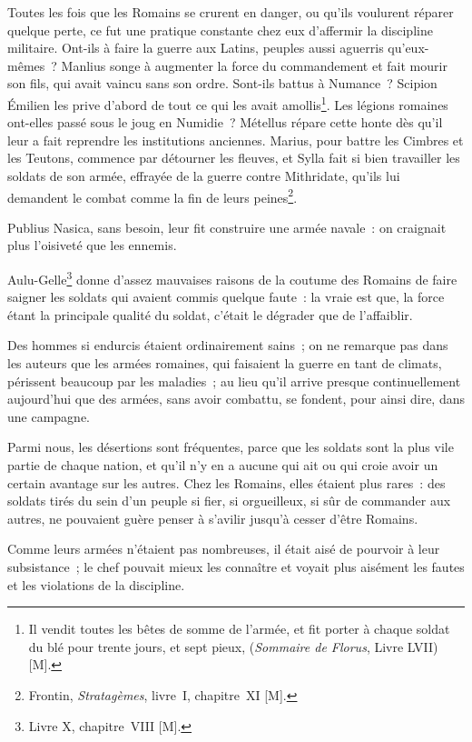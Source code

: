 \documentclass[french,twoside]{book} %
\begin{document}
Toutes les fois que les Romains se crurent en danger, ou qu’ils voulurent réparer quelque perte, ce fut une pratique constante chez eux d’affermir la discipline militaire. Ont-ils à faire la guerre aux Latins, peuples aussi aguerris qu’eux-mêmes ? Manlius songe à augmenter la force du commandement et fait mourir son fils, qui avait vaincu sans son ordre. Sont-ils battus à Numance ? Scipion Émilien les prive d’abord de tout ce qui les avait amollis\footnote{Il vendit toutes les bêtes de somme de l’armée, et fit porter à chaque soldat du blé pour trente jours, et sept pieux, ({\itshape Sommaire de Florus}, Livre LVII) [M].}. Les légions romaines ont-elles passé sous le joug en Numidie ? Métellus répare cette honte dès qu’il leur a fait reprendre les institutions anciennes. Marius, pour battre les Cimbres et les Teutons, commence par détourner les fleuves, et Sylla fait si bien travailler les soldats de son armée, effrayée de la guerre contre Mithridate, qu’ils lui demandent le combat comme la fin de leurs peines\footnote{Frontin, {\itshape Stratagèmes}, livre I, chapitre XI [M].}.\par
Publius Nasica, sans besoin, leur fit construire une armée navale : on craignait plus l’oisiveté que les ennemis.\par
Aulu-Gelle\footnote{Livre X, chapitre VIII [M].} donne d’assez mauvaises raisons de la coutume des Romains de faire saigner les soldats qui avaient commis quelque faute : la vraie est que, la force étant la principale qualité du soldat, c’était le dégrader que de l’affaiblir.\par
Des hommes si endurcis étaient ordinairement sains ; on ne remarque pas dans les auteurs que les armées romaines, qui faisaient la guerre en tant de climats, périssent beaucoup par les maladies ; au lieu qu’il arrive presque continuellement aujourd’hui que des armées, sans avoir combattu, se fondent, pour ainsi dire, dans une campagne.\par
Parmi nous, les désertions sont fréquentes, parce que les soldats sont la plus vile partie de chaque nation, et qu’il n’y en a aucune qui ait ou qui croie avoir un certain avantage sur les autres. Chez les Romains, elles étaient plus rares : des soldats tirés du sein d’un peuple si fier, si orgueilleux, si sûr de commander aux autres, ne pouvaient guère penser à s’avilir jusqu’à cesser d’être Romains.\par
Comme leurs armées n’étaient pas nombreuses, il était aisé de pourvoir à leur subsistance ; le chef pouvait mieux les connaître et voyait plus aisément les fautes et les violations de la discipline.\par
\end{document}
